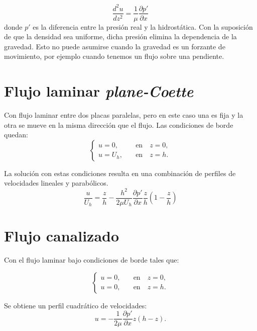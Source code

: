 \documentclass[openany]{book}
\begin{document}
\begin{equation}
    \frac{d^2u}{dz^2}=\frac{1}{\mu}\frac{\partial p'}{\partial x}
\end{equation}
donde $p'$ es la diferencia entre la presión real y la
hidrostática. Con la suposición de que la densidad sea uniforme,
dicha presión elimina la dependencia de la gravedad. Esto no
puede asumirse cuando la gravedad es un forzante de movimiento,
por ejemplo cuando tenemos un flujo sobre una pendiente.

\section{Flujo laminar \textit{plane-Coette}}
Con flujo laminar entre dos placas paralelas, pero en este caso
una es fija y la otra se mueve en la misma dirección que el flujo.
Las condiciones de borde quedan:
\begin{equation}
    \begin{cases}
        u=0,&\quad \mathrm{en}\quad z=0,\\
        u=U_h,&\quad \mathrm{en}\quad z=h.
    \end{cases}
\end{equation}

\par La solución con estas condiciones resulta en una combinación
de perfiles de velocidades lineales y parabólicos.
\begin{equation}
    \frac{u}{U_h}=\frac{z}{h}-\frac{h^2}{2\mu U_h}\frac{\partial p'}{\partial x}\frac{z}{h}\left(1-\frac{z}{h}\right)
\end{equation}

\section{Flujo canalizado}
Con el flujo laminar bajo condiciones de borde tales que:

\begin{equation}
    \begin{cases}
        u=0,&\quad \mathrm{en}\quad z=0,\\
        u=0,&\quad \mathrm{en}\quad z=h.
    \end{cases}
\end{equation}

Se obtiene un perfil cuadrático de velocidades:
\begin{equation}
    u=-\frac1{2\mu}\frac{\partial p'}{\partial x}z(h-z).
\end{equation}
\end{document}
